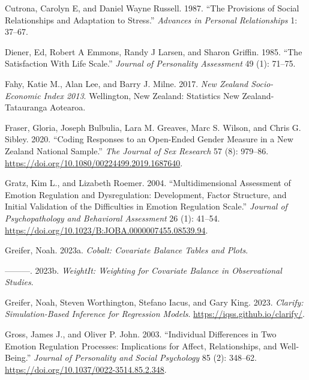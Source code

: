 \documentclass[
  singlecolumn]{report}
\newlength{\cslhangindent}
\newlength{\cslentryspacingunit} %
\newenvironment{CSLReferences}[2] %
 {%
  \setlength{\parindent}{0pt}
  \ifodd #1
  \let\oldpar\par
  \def\par{\hangindent=\cslhangindent\oldpar}
  \fi
  \setlength{\parskip}{#2\cslentryspacingunit}
 }%
 {}
\begin{document}
\begin{CSLReferences}{1}{0}
\leavevmode{}%
Cutrona, Carolyn E, and Daniel Wayne Russell. 1987. {``The Provisions of
Social Relationships and Adaptation to Stress.''} \emph{Advances in
Personal Relationships} 1: 37--67.

\leavevmode{}%
Diener, Ed, Robert A Emmons, Randy J Larsen, and Sharon Griffin. 1985.
{``The Satisfaction With Life Scale.''} \emph{Journal of Personality
Assessment} 49 (1): 71--75.

\leavevmode{}%
Fahy, Katie M., Alan Lee, and Barry J. Milne. 2017. \emph{New Zealand
Socio-Economic Index 2013}. Wellington, New Zealand: Statistics New
Zealand-Tatauranga Aotearoa.

\leavevmode{}%
Fraser, Gloria, Joseph Bulbulia, Lara M. Greaves, Marc S. Wilson, and
Chris G. Sibley. 2020. {``Coding Responses to an Open-Ended Gender
Measure in a New Zealand National Sample.''} \emph{The Journal of Sex
Research} 57 (8): 979--86.
\url{https://doi.org/10.1080/00224499.2019.1687640}.

\leavevmode{}%
Gratz, Kim L., and Lizabeth Roemer. 2004. {``Multidimensional Assessment
of Emotion Regulation and Dysregulation: Development, Factor Structure,
and Initial Validation of the Difficulties in Emotion Regulation
Scale.''} \emph{Journal of Psychopathology and Behavioral Assessment} 26
(1): 41--54. \url{https://doi.org/10.1023/B:JOBA.0000007455.08539.94}.

\leavevmode{}%
Greifer, Noah. 2023a. \emph{Cobalt: Covariate Balance Tables and Plots}.

\leavevmode{}%
---------. 2023b. \emph{WeightIt: Weighting for Covariate Balance in
Observational Studies}.

\leavevmode{}%
Greifer, Noah, Steven Worthington, Stefano Iacus, and Gary King. 2023.
\emph{Clarify: Simulation-Based Inference for Regression Models}.
\url{https://iqss.github.io/clarify/}.

\leavevmode{}%
Gross, James J., and Oliver P. John. 2003. {``Individual Differences in
Two Emotion Regulation Processes: Implications for Affect,
Relationships, and Well-Being.''} \emph{Journal of Personality and
Social Psychology} 85 (2): 348--62.
\url{https://doi.org/10.1037/0022-3514.85.2.348}.


\end{CSLReferences}
\end{document}
